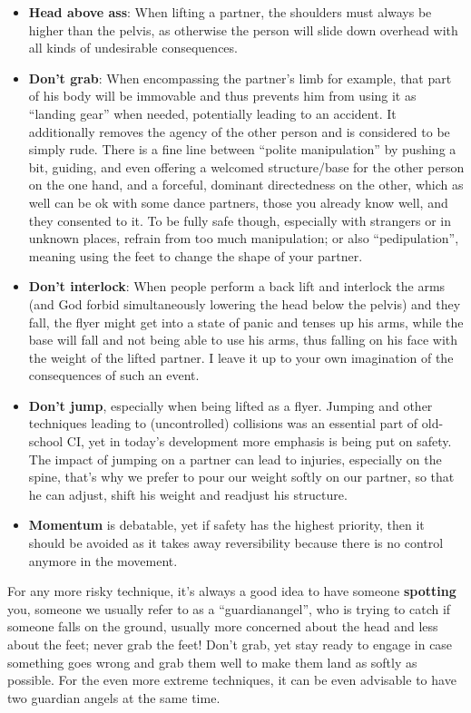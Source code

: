 \begin{itemize}
    \item \textbf{Head above ass}: When lifting a partner, the shoulders must always be higher than the pelvis, as otherwise the person will slide down overhead with all kinds of undesirable consequences.
    \item \textbf{Don't grab}: When encompassing the partner's limb for example, that part of his body will be immovable and thus prevents him from using it as ``landing gear'' when needed, potentially leading to an accident.
    It additionally removes the agency of the other person and is considered to be simply rude.
    There is a fine line between ``polite manipulation'' by pushing a bit, guiding, and even offering a welcomed structure/base for the other person on the one hand, and a forceful, dominant directedness on the other, which as well can be ok with some dance partners, those you already know well, and they consented to it.
    To be fully safe though, especially with strangers or in unknown places, refrain from too much manipulation; or also ``pedipulation'', meaning using the feet to change the shape of your partner.
    \item \textbf{Don't interlock}: When people perform a back lift and interlock the arms (and God forbid simultaneously lowering the head below the pelvis) and they fall, the flyer might get into a state of panic and tenses up his arms, while the base will fall and not being able to use his arms, thus falling on his face with the weight of the lifted partner.
    I leave it up to your own imagination of the consequences of such an event.
    \item \textbf{Don't jump}, especially when being lifted as a flyer.
    Jumping and other techniques leading to (uncontrolled) collisions was an essential part of old-school CI, yet in today's development more emphasis is being put on safety.
    The impact of jumping on a partner can lead to injuries, especially on the spine, that's why we prefer to pour our weight softly on our partner, so that he can adjust, shift his weight and readjust his structure.
    \item \textbf{Momentum} is debatable, yet if safety has the highest priority, then it should be avoided as it takes away reversibility because there is no control anymore in the movement.
\end{itemize}

For any more risky technique, it's always a good idea to have someone \textbf{spotting} you, someone we usually refer to as a ``\gls{guardianangel}'', who is trying to catch if someone falls on the ground, usually more concerned about the head and less about the feet; never grab the feet!
Don't grab, yet stay ready to engage in case something goes wrong and grab them well to make them land as softly as possible.
For the even more extreme techniques, it can be even advisable to have two guardian angels at the same time.


